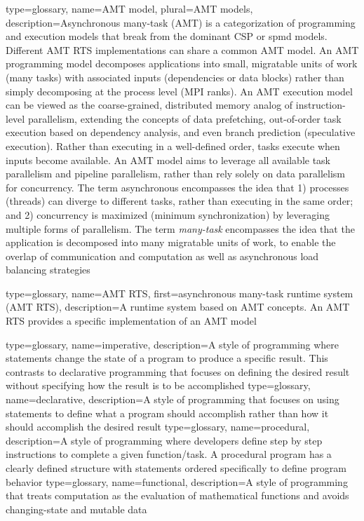 {
  type=glossary,
  name={AMT model},
  plural={AMT models},
  description={Asynchronous many-task (AMT) is a categorization of programming
    and \glspl{execution model} that break from the dominant \gls{CSP} or \gls{spmd} models.
      Different \gls{AMT RTS} implementations can share a common AMT model.
	An AMT \gls{programming model} decomposes applications into small,
  \gls{migratable} units of work (many tasks) with associated inputs (dependencies or data blocks) rather than simply decomposing at the process level (\gls{MPI} ranks).
	An AMT \gls{execution model} can be viewed as the coarse-grained, distributed memory analog of instruction-level parallelism, extending the concepts of data prefetching,
	out-of-order task execution based on dependency analysis, and even branch
    prediction (\gls{speculative execution}). 
	Rather than executing in a well-defined order, tasks execute when inputs become available.
	An AMT model aims to leverage all available \gls{task parallelism} and
  \gls{pipeline parallelism},
  rather than rely solely on \gls{data parallelism} for \gls{concurrency}.
	The term asynchronous encompasses the idea that 1) processes (threads) can
  diverge to different tasks, rather than executing in the same order; and 2)
  \gls{concurrency} is maximized (minimum synchronization) by leveraging multiple forms of parallelism.
	The term {\em many-task} encompasses the idea that the application is
  decomposed into many \gls{migratable} units of work, to enable the overlap of
  communication and computation as well as \gls{asynchronous} load balancing strategies}
}



{
  type=glossary,
  name={AMT RTS},
  first={asynchronous many-task runtime system (AMT RTS)},
  description={A runtime system based on \gls{AMT} concepts. An AMT RTS provides a specific implementation of an \gls{AMT model}}
}

{
  type=glossary,
  name={imperative},
  description={A style of programming where statements change the state of a program to produce a specific result. This contrasts to declarative programming that focuses on defining the desired result without specifying how the result is to be accomplished}
}
{
  type=glossary,
  name={declarative},
  description={A style of programming that focuses on using statements to define what a program should accomplish rather than how it should accomplish the desired result}
}
{
  type=glossary,
  name={procedural},
  description={A style of programming where developers define step by step instructions to complete a given function/task. A procedural program has a clearly defined structure with statements ordered specifically to define program behavior}
}
{
  type=glossary,
  name={functional},
  description={A style of programming that treats computation as the
    evaluation of mathematical functions and avoids changing-state and mutable
      data}
}


